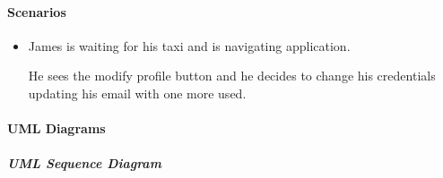 \paragraph{Scenarios}
\begin{itemize}
	\item James is waiting for his taxi and is navigating \myTaxiService{} application. \par He sees the modify profile button and he decides to change his credentials updating his email with one more used.
\end{itemize}
\paragraph{UML Diagrams}
\subparagraph{UML Sequence Diagram}
